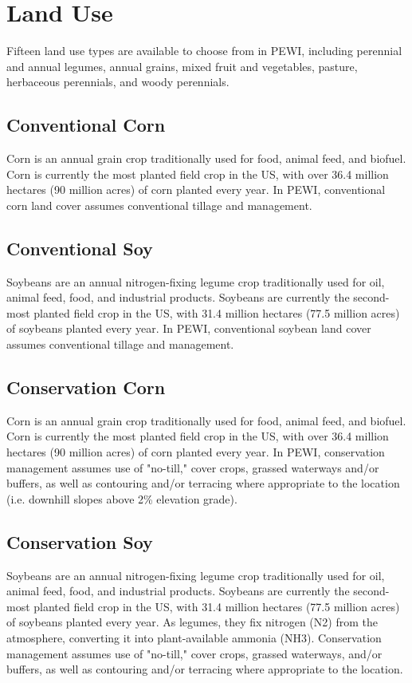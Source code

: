 \documentclass[11pt]{article}
\begin{document}

\section{Land Use}\label{sec:landuse}
Fifteen land use types are available to choose from in PEWI, including perennial and annual legumes, annual grains, mixed fruit and vegetables, pasture, herbaceous perennials, and woody perennials.

\subsection{Conventional Corn}
Corn is an annual grain crop traditionally used for food, animal feed, and biofuel. Corn is currently the most planted field crop in the US, with over 36.4 million hectares (90 million acres) of corn planted every year\cite{1}.  In PEWI, conventional corn land cover assumes conventional tillage and management.

\subsection{Conventional Soy}
Soybeans are an annual nitrogen-fixing legume crop traditionally used for oil, animal feed, food, and industrial products. Soybeans are currently the second-most planted field crop in the US, with 31.4 million hectares (77.5 million acres) of soybeans planted every year\cite{2}.  In PEWI, conventional soybean land cover assumes conventional tillage and management. 

\subsection{Conservation Corn}
Corn is an annual grain crop traditionally used for food, animal feed, and biofuel. Corn is currently the most planted field crop in the US, with over 36.4 million hectares (90 million acres) of corn planted every year\cite{3}.  In PEWI, conservation management assumes use of "no-till," cover crops, grassed waterways and/or buffers, as well as contouring and/or terracing where appropriate to the location (i.e. downhill slopes above 2\% elevation grade).

\subsection{Conservation Soy}
Soybeans are an annual nitrogen-fixing legume crop traditionally used for oil, animal feed, food, and industrial products. Soybeans are currently the second-most planted field crop in the US, with 31.4 million hectares (77.5 million acres) of soybeans planted every year\cite{4}.  As legumes, they fix nitrogen (N2) from the atmosphere, converting it into plant-available ammonia (NH3). Conservation management assumes use of "no-till," cover crops, grassed waterways, and/or buffers, as well as contouring and/or terracing where appropriate to the location.
\end{document}

